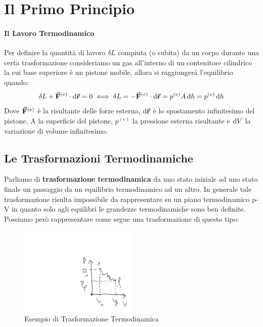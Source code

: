 \documentclass{article}
\renewcommand{\r}{\va{r}}
\newcommand{\F}{\va{F}}
\begin{document}
\section{Il Primo Principio}
\paragraph{Il Lavoro Termodinamico}
Per definire la quantità di lavoro $\delta L$ compiuta (o subita) da un corpo durante una certa trasformazione consideriamo un gas all'interno di un contenitore cilindrico la cui base superiore è un pistone mobile, allora si raggiungerà l'equilibrio quando:
\[\delta L+\F^{(e)}\cdot\dif\r=0\iff \delta L=-\F^{(e)}\cdot\dif\r=p^{(e)}A\dif h=p^{(e)}\dif h\]
Dove $\F^{(e)}$ è la risultante delle forze esterna, $\dif\r$ è lo spostamento infinitesimo del pistone, A la superficie del pistone, $p^{(e)}$ la pressione esterna risultante e $\dif V$ la variazione di volume infinitesimo.

\subsection{Le Trasformazioni Termodinamiche}
Parliamo di \textbf{trasformazione termodinamica} da uno stato iniziale ad uno stato finale un passaggio da un equilibrio termodinamico ad un altro. In generale tale trasformazione risulta impossibile da rappresentare su un piano termodinamico p-V in quanto solo agli equilibri le grandezze termodinamiche sono ben definite. Possiamo però rappresentare come segue una trasformazione di questo tipo:
\begin{figure}[H]
    \centering
    \includegraphics[width=0.5\textwidth]{TrasformazioneIrreversibile.png}
    \caption{Esempio di Trasformazione Termodinamica}
    \label{TrasfIrrev}
\end{figure}
\end{document}
